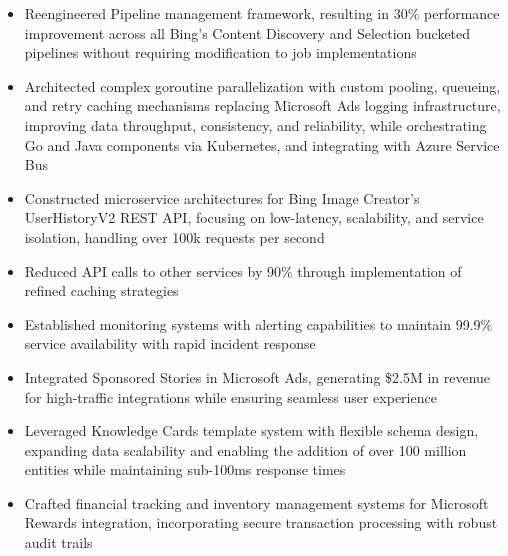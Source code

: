 \begin{itemize}
    \item \small{Reengineered Pipeline management framework, resulting in 30\% performance
        improvement across all Bing's Content Discovery and Selection bucketed pipelines without
        requiring modification to job implementations}

    \item \small{Architected complex goroutine parallelization with custom pooling, queueing, and retry 
        caching mechanisms replacing Microsoft Ads logging infrastructure, improving data throughput,
        consistency, and reliability, while orchestrating Go and Java components via Kubernetes, and
        integrating with Azure Service Bus}
    
    \item \small{Constructed microservice architectures for Bing Image Creator's UserHistoryV2 REST 
        API, focusing on low-latency, scalability, and service isolation, handling over 100k requests per 
        second}
    \item \small{Reduced API calls to other services by 90\% through implementation of refined caching strategies}
    
    \item \small{Established monitoring systems with alerting capabilities to maintain 99.9\%
        service availability with rapid incident response}


    \item \small{Integrated Sponsored Stories in Microsoft Ads, generating \$2.5M in revenue for
        high-traffic integrations while ensuring seamless user experience}

    \item \small{Leveraged Knowledge Cards template system with flexible schema design, expanding
        data scalability and enabling the addition of over 100 million entities while maintaining
        sub-100ms response times}

    \item \small{Crafted financial tracking and inventory management systems for Microsoft Rewards
        integration, incorporating secure transaction processing with robust audit trails}

\end{itemize}
